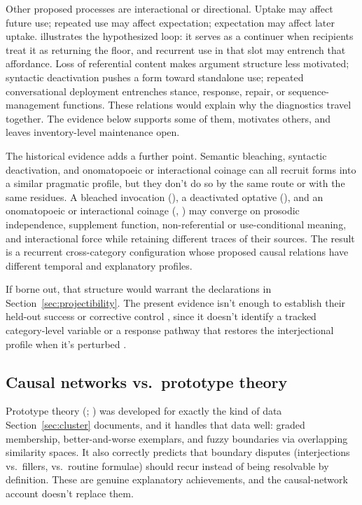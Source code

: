 \documentclass[12pt]{article}
\begin{document}
Other proposed processes are interactional or directional. Uptake may affect
future use; repeated use may affect expectation; expectation may affect later
uptake.  illustrates the hypothesized loop: it serves as a
continuer when recipients treat it as returning the floor, and recurrent use
in that slot may entrench that affordance.
Loss of referential content makes argument structure less motivated;
syntactic deactivation pushes a form toward standalone use; repeated
conversational deployment entrenches stance, response, repair, or
sequence-management functions. These relations would explain why the
diagnostics travel together. The evidence below supports some of them,
motivates others, and leaves inventory-level maintenance open.

The historical evidence adds a further point. Semantic bleaching,
syntactic deactivation, and onomatopoeic or interactional coinage can all
recruit forms into a similar pragmatic profile, but they don't do so by
the same route or with the same residues. A bleached invocation (), a
deactivated optative (), and an onomatopoeic or
interactional coinage (, ) may
converge on prosodic independence, supplement function,
non-referential or use-conditional meaning, and interactional force while
retaining different traces of their sources. The result is a recurrent
cross-category configuration whose proposed causal relations have different
temporal and explanatory profiles.

If borne out, that structure would warrant the declarations in
Section~\ref{sec:projectibility}. The present evidence isn't enough to
establish their held-out success or corrective
control \citep[in the sense of][6]{reynolds2026notEveryStableCluster},
since it doesn't identify a tracked category-level variable or a response
pathway that restores the interjectional profile when it's perturbed
\citep[cf.][]{weinberger2026HomeostasisCausalControl}.

\subsection{Causal networks vs.\ prototype theory}\label{sec:prototype}

Prototype theory (\citealp{rosch1975}; \citealp[43--53]{taylor2003}) was developed for exactly
the kind of data Section~\ref{sec:cluster} documents, and it handles
that data well: graded membership, better-and-worse exemplars, and
fuzzy boundaries via overlapping similarity spaces. It also correctly
predicts that boundary disputes (interjections vs.\ fillers, vs.\
routine formulae) should recur instead of being resolvable by
definition. These are genuine explanatory achievements, and the
causal-network account doesn't replace them.
\end{document}
